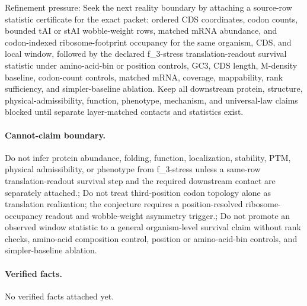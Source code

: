 Refinement pressure: Seek the next reality boundary by attaching a source-row statistic certificate for the exact packet: ordered CDS coordinates, codon counts, bounded tAI or stAI wobble-weight rows, matched mRNA abundance, and codon-indexed ribosome-footprint occupancy for the same organism, CDS, and local window, followed by the declared f\_3-stress translation-readout survival statistic under amino-acid-bin or position controls, GC3, CDS length, M-density baseline, codon-count controls, matched mRNA, coverage, mappability, rank sufficiency, and simpler-baseline ablation. Keep all downstream protein, structure, physical-admissibility, function, phenotype, mechanism, and universal-law claims blocked until separate layer-matched contacts and statistics exist.

\paragraph{Cannot-claim boundary.} Do not infer protein abundance, folding, function, localization, stability, PTM, physical admissibility, or phenotype from f\_3-stress unless a same-row translation-readout survival step and the required downstream contact are separately attached.; Do not treat third-position codon topology alone as translation realization; the conjecture requires a position-resolved ribosome-occupancy readout and wobble-weight asymmetry trigger.; Do not promote an observed window statistic to a general organism-level survival claim without rank checks, amino-acid composition control, position or amino-acid-bin controls, and simpler-baseline ablation.

\paragraph{Verified facts.}
No verified facts attached yet.
